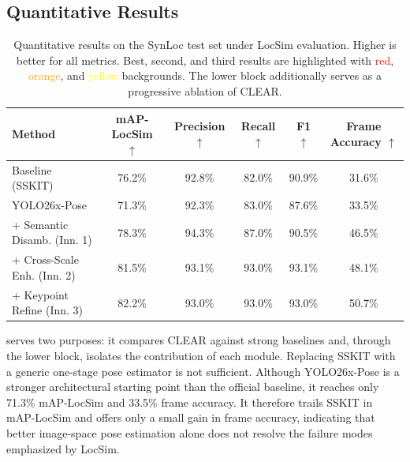 \subsection{Quantitative Results}
\label{sec:quantitative}

\begin{table}[t]
    \centering
    \setlength{\tabcolsep}{7pt}
    \caption{Quantitative results on the SynLoc test set under LocSim evaluation. Higher is better for all metrics. Best, second, and third results are highlighted with \textcolor{red}{red}, \textcolor{orange}{orange}, and \textcolor{yellow}{yellow} backgrounds. The lower block additionally serves as a progressive ablation of CLEAR.}
    \label{tab:locsim_main_results}
    \begin{tabular}{lccccc}
        \toprule
        Method & mAP-LocSim $\uparrow$ & Precision $\uparrow$ & Recall $\uparrow$ & F1 $\uparrow$ & Frame Accuracy $\uparrow$ \\
        \midrule
        Baseline (SSKIT) & 76.2\% & 92.8\% & \cellcolor{yellow!35}82.0\% & \cellcolor{yellow!35}90.9\% & 31.6\% \\
        YOLO26x-Pose & 71.3\% & 92.3\% & 83.0\% & 87.6\% & 33.5\% \\
        \midrule
        + Semantic Disamb. (Inn. 1) & \cellcolor{yellow!35}78.3\% & \cellcolor{red!25}94.3\% & \cellcolor{orange!35}87.0\% & 90.5\% & \cellcolor{yellow!35}46.5\% \\
        + Cross-Scale Enh. (Inn. 2) & \cellcolor{orange!35}81.5\% & \cellcolor{orange!35}93.1\% & \cellcolor{red!25}93.0\% & \cellcolor{red!25}93.1\% & \cellcolor{orange!35}48.1\% \\
        + Keypoint Refine (Inn. 3) & \cellcolor{red!25}82.2\% & \cellcolor{yellow!35}93.0\% & \cellcolor{red!25}93.0\% & \cellcolor{orange!35}93.0\% & \cellcolor{red!25}50.7\% \\
        \bottomrule
    \end{tabular}
\end{table}

 serves two purposes: it compares CLEAR against strong baselines and, through the lower block, isolates the contribution of each module. Replacing SSKIT with a generic one-stage pose estimator is not sufficient. Although YOLO26x-Pose is a stronger architectural starting point than the official baseline, it reaches only 71.3\% mAP-LocSim and 33.5\% frame accuracy. It therefore trails SSKIT in mAP-LocSim and offers only a small gain in frame accuracy, indicating that better image-space pose estimation alone does not resolve the failure modes emphasized by LocSim.

